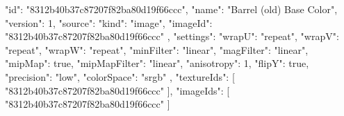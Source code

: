 {
  "id": "8312b40b37c87207f82ba80d19f66ccc",
  "name": "Barrel (old) Base Color",
  "version": 1,
  "source": {
    "kind": "image",
    "imageId": "8312b40b37c87207f82ba80d19f66ccc"
  },
  "settings": {
    "wrapU": "repeat",
    "wrapV": "repeat",
    "wrapW": "repeat",
    "minFilter": "linear",
    "magFilter": "linear",
    "mipMap": true,
    "mipMapFilter": "linear",
    "anisotropy": 1,
    "flipY": true,
    "precision": "low",
    "colorSpace": "srgb"
  },
  "textureIds": [
    "8312b40b37c87207f82ba80d19f66ccc"
  ],
  "imageIds": [
    "8312b40b37c87207f82ba80d19f66ccc"
  ]
}

